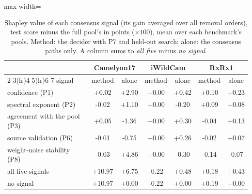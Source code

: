 \begin{table}[t]
\centering
\footnotesize
\caption{Shapley value of each consensus signal (its gain averaged over all removal orders), test score minus the full pool's in points ($\times100$), mean over each benchmark's pools. Method: the decider with P7 and held-out search; alone: the consensus paths only. A column sums to \emph{all five} minus \emph{no signal}.}
\label{tab:signals}
\setlength{\tabcolsep}{4pt}\begin{adjustbox}{max width=\linewidth}
\begin{tabular}{lcccccc}
\toprule
 & \multicolumn{2}{c}{Camelyon17} & \multicolumn{2}{c}{iWildCam} & \multicolumn{2}{c}{RxRx1} \\ \cmidrule(lr){2-3}\cmidrule(lr){4-5}\cmidrule(lr){6-7} signal & method & alone & method & alone & method & alone \\
\midrule
confidence (P1) & +0.02 & +2.90 & +0.00 & +0.42 & +0.10 & +0.23 \\
spectral exponent (P2) & -0.02 & +1.10 & +0.00 & -0.20 & +0.09 & +0.08 \\
agreement with the pool (P3) & +0.05 & -1.36 & +0.00 & +0.30 & -0.04 & +0.13 \\
source validation (P6) & -0.01 & -0.75 & +0.00 & +0.26 & -0.02 & +0.07 \\
weight-noise stability (P8) & -0.03 & +4.86 & +0.00 & -0.30 & -0.14 & -0.07 \\
\midrule
all five signals & +10.97 & +6.75 & -0.22 & +0.48 & +0.18 & +0.43 \\
no signal & +10.97 & +0.00 & -0.22 & +0.00 & +0.19 & +0.00 \\
\bottomrule
\end{tabular}
\end{adjustbox}
\end{table}
